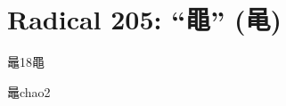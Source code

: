 
\section*{Radical 205: ``⿌'' (黾)}

\begin{Entry}{鼂}{18}{⿌}
  \begin{Phonetics}{鼂}{chao2}
  \end{Phonetics}
\end{Entry}


